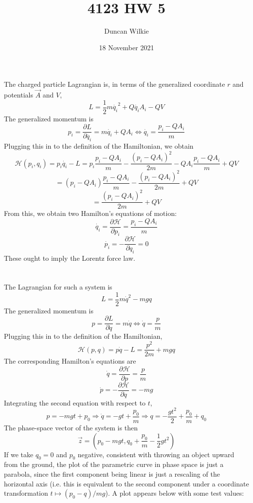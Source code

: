 \documentclass{article}
\title{4123 HW 5}
\author{Duncan Wilkie}
\date{18 November 2021}
\begin{document}
\maketitle

\section{}
The charged particle Lagrangian is, in terms of the generalized coordinate $r$ and potentials $\vec{A}$ and $V$,
\[L=\frac{1}{2}m\dot{q_i}^2+Q\dot{q_i}A_i-QV\]
The generalized momentum is
\[p_i=\frac{\partial L}{\partial\dot{q_i}}=m\dot{q_i}+QA_i\Leftrightarrow \dot{q_i}={\frac{p_i-QA_i}{m}}\]
Plugging this in to the definition of the Hamiltonian, we obtain
\[\mathcal{H}(p_i,q_i)=p_i\dot{q_i}-L=p_i{\frac{p_i-QA_i}{m}}- {\frac{(p_i-QA_i)^2}{2m}}-QA_i{\frac{p_i-QA_i}{m}}+QV\]
\[=(p_i-QA_i)\frac{p_i-QA_i}{m}-\frac{(p_i-QA_i)^2}{2m}+QV\]
\[=\frac{(p_i-QA_i)^2}{2m}+QV\]
From this, we obtain two Hamilton's equations of motion:
\[\dot{q_i}=\frac{\partial\mathcal{H}}{\partial p_i}=\frac{p_i-QA_i}{m}\]
\[\dot{p_i}=-\frac{\partial \mathcal{H}}{\partial q_i}=0\]
These ought to imply the Lorentz force law.

\section{}
The Lagrangian for such a system is
\[L=\frac{1}{2}m\dot{q}^2-mgq\]
The generalized momentum is
\[p=\frac{\partial L}{\partial \dot{q}}=m\dot{q}\Leftrightarrow \dot{q}=\frac{p}{m}\]
Plugging this in to the definition of the Hamiltonian,
\[\mathcal{H}(p,q)=p\dot{q}-L=\frac{p^2}{2m}+mgq\]
The corresponding Hamilton's equations are
\[\dot{q}=\frac{\partial \mathcal{H}}{\partial p}=\frac{p}{m}\]
\[\dot{p}=-\frac{\partial\mathcal{H}}{\partial q}=-mg\]
Integrating the second equation with respect to $t$,
\[p=-mgt+p_0\Rightarrow \dot{q}=-gt+\frac{p_0}{m}\Rightarrow q=-\frac{gt^2}{2}+\frac{p_0}{m}+q_0\]
The phase-space vector of the system is then
\[\vec{z}=\left(p_0-mgt, q_0+\frac{p_0}{m}-\frac{1}{2}gt^2\right)\]
If we take $q_0=0$ and $p_0$ negative, consistent with throwing an object upward from the ground, the plot of the parametric curve in phase space is just a parabola, since the first component being linear is just a rescaling of the horizontal axis (i.e. this is equivalent to the second component under a coordinate transformation $t\mapsto (p_0-q)/mg$). A plot appears below with some test values:
\end{document}

